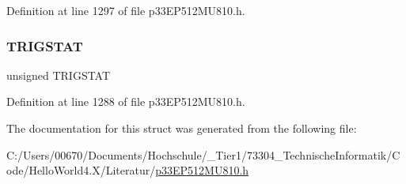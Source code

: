 Definition at line 1297 of file p33\+E\+P512\+M\+U810.\+h.

\mbox{\label{structtag_i_c14_c_o_n2_b_i_t_s_ab379549de54ac93ad4aa73686c34cb7c}} 
\subsubsection{\texorpdfstring{T\+R\+I\+G\+S\+T\+AT}{TRIGSTAT}}
{\footnotesize\ttfamily unsigned T\+R\+I\+G\+S\+T\+AT}



Definition at line 1288 of file p33\+E\+P512\+M\+U810.\+h.



The documentation for this struct was generated from the following file\+:\begin{DoxyCompactItemize}
\item 
C\+:/\+Users/00670/\+Documents/\+Hochschule/\+\_\+\+Tier1/73304\+\_\+\+Technische\+Informatik/\+Code/\+Hello\+World4.\+X/\+Literatur/\hyperlink{p33_e_p512_m_u810_8h}{p33\+E\+P512\+M\+U810.\+h}\end{DoxyCompactItemize}
